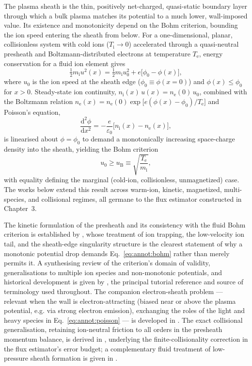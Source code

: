 The plasma sheath is the thin, positively net-charged, quasi-static boundary layer through which a bulk plasma matches its potential to a much lower, wall-imposed value. Its existence and monotonicity depend on the Bohm criterion, bounding the ion speed entering the sheath from below. For a one-dimensional, planar, collisionless system with cold ions ($T_{\mathrm{i}} \to 0$) accelerated through a quasi-neutral presheath and Boltzmann-distributed electrons at temperature $T_{\mathrm{e}}$, energy conservation for a fluid ion element gives
\begin{equation}
\tfrac{1}{2} m_{\mathrm{i}} u^{2}(x) = \tfrac{1}{2} m_{\mathrm{i}} u_{0}^{2} + e\bigl[\phi_{0} - \phi(x)\bigr],
\label{eq:annot:ionenergy}
\end{equation}
where $u_{0}$ is the ion speed at the sheath edge ($\phi_{0} \equiv \phi(x{=}0)$) and $\phi(x) \le \phi_{0}$ for $x>0$. Steady-state ion continuity, $n_{\mathrm{i}}(x)\,u(x) = n_{\mathrm{e}}(0)\,u_{0}$, combined with the Boltzmann relation $n_{\mathrm{e}}(x) = n_{\mathrm{e}}(0)\exp\!\bigl[e(\phi(x)-\phi_{0})/T_{\mathrm{e}}\bigr]$ and Poisson's equation,
\begin{equation}
\frac{\mathrm{d}^{2}\phi}{\mathrm{d}x^{2}} = -\frac{e}{\varepsilon_{0}}\bigl[n_{\mathrm{i}}(x) - n_{\mathrm{e}}(x)\bigr],
\label{eq:annot:poisson}
\end{equation}
is linearised about $\phi = \phi_{0}$ to demand a monotonically increasing space-charge density into the sheath, yielding the Bohm criterion
\begin{equation}
u_{0} \ge u_{\mathrm{B}} \equiv \sqrt{\frac{T_{\mathrm{e}}}{m_{\mathrm{i}}}},
\label{eq:annot:bohm}
\end{equation}
with equality defining the marginal (cold-ion, collisionless, unmagnetized) case. The works below extend this result across warm-ion, kinetic, magnetized, multi-species, and collisional regimes, all germane to the flux estimator constructed in Chapter~3.

The kinetic formulation of the presheath and its consistency with the fluid Bohm criterion is established by \cite{ref0001}, whose treatment of ion trapping, the low-velocity ion tail, and the sheath-edge singularity structure is the clearest statement of why a monotonic potential drop demands Eq.~\eqref{eq:annot:bohm} rather than merely permits it. A synthesising review of the criterion's domain of validity, generalisations to multiple ion species and non-monotonic potentials, and historical development is given by \cite{ref0004}, the principal tutorial reference and source of terminology used throughout. The companion electron-sheath problem --- relevant when the wall is electron-attracting (biased near or above the plasma potential, e.g. via strong electron emission), exchanging the roles of the light and heavy species in Eq.~\eqref{eq:annot:poisson} --- is developed in \cite{ref0006}. The exact collisional generalisation, retaining ion-neutral friction to all orders in the presheath momentum balance, is derived in \cite{ref0009}, underlying the finite-collisionality correction in the flux estimator's error budget; a complementary fluid treatment of low-pressure sheath formation is given in \cite{ref0024}.


